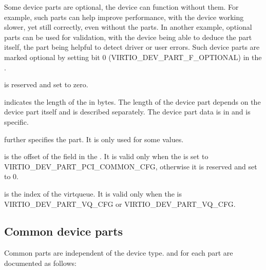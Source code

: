 Some device parts are optional, the device can function without them.
For example, such parts can help improve performance, with the device working
slower, yet still correctly, even without the parts. In another example,
optional parts can be used for validation, with the device being able to deduce
the part itself, the part being helpful to detect driver or user errors.
Such device parts are marked optional by setting bit 0
(VIRTIO_DEV_PART_F_OPTIONAL) in the .

 is reserved and set to zero.

 indicates the length of the  in bytes. The length
of the device part depends on the device part itself and is described separately.
The device part data is in  and is  specific.

 further specifies the part. It is only used for some
 values.

 is the offset of the
field in the . It is valid only when the  is set to VIRTIO_DEV_PART_PCI_COMMON_CFG,
otherwise it is reserved and set to 0.

 is the index of the virtqueue. It is valid
only when the  is VIRTIO_DEV_PART_VQ_CFG or
VIRTIO_DEV_PART_VQ_CFG.

\subsection{Common device parts}\label{sec:Basic Facilities of a Virtio Device / Device parts / Common device parts}

Common parts are independent of the device type.
 and  for each part are documented as follows:

